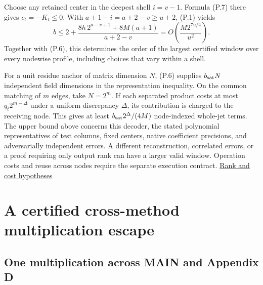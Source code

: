 \documentclass[
  11pt,
]{article}
\begin{document}
Choose any retained center in the deepest shell \(i=v-1\). Formula (P.7)
there gives \(c_t=-K_t\le0\). With \(a+1-i=a+2-v\ge u+2\), (P.1) yields
\[
 b\le 2+\frac{8h\,2^{a-v+1}+8M(a+1)}{a+2-v}
    = O\!\left(\frac{M2^{7u/4}}{u^2}\right).
\] Together with (P.6), this determines the order of the largest
certified window over every nodewise profile, including choices that
vary within a shell.

For a unit residue anchor of matrix dimension \(N\), (P.6) supplies
\(b_{\rm sat}N\) independent field dimensions in the representation
inequality. On the common matching of \(m\) edges, take \(N=2^m\). If
each separated product costs at most \(q_t2^{m-\Delta}\) under a uniform
discrepancy \(\Delta\), its contribution is charged to the receiving
node. This gives at least \(b_{\rm sat}2^\Delta/(4M)\) node-indexed
whole-jet terms. The upper bound above concerns this decoder, the stated
polynomial representatives of test columns, fixed centers, native
coefficient precisions, and adversarially independent errors. A
different reconstruction, correlated errors, or a proof requiring only
output rank can have a larger valid window. Operation costs and reuse
across nodes require the separate execution contract.
\href{https://github.com/dch-and-Elara/some-research-inspired-by-openais-eth-preprint/tree/main/rank-budget-barriers}{Rank and cost hypotheses}

\section{A certified cross-method multiplication
escape}\label{a-certified-cross-method-multiplication-escape}

\subsection{One multiplication across MAIN and Appendix
D}\label{one-multiplication-across-main-and-appendix-d}
\end{document}
